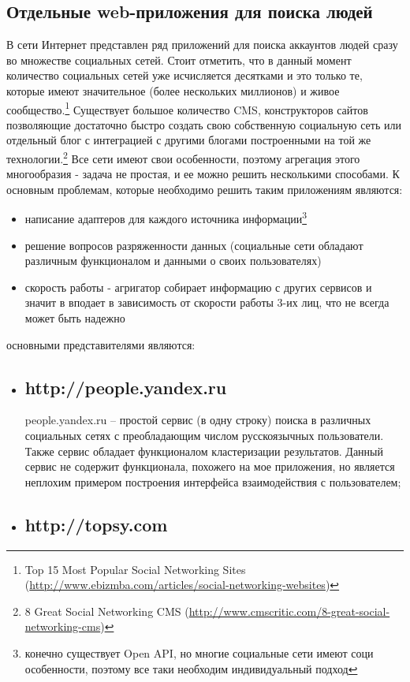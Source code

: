 \begin{chap1}
\subsection{Отдельные web-приложения для поиска людей}
В сети Интернет представлен ряд приложений для поиска аккаунтов людей сразу во множестве социальных сетей. Стоит отметить, что в данный момент количество социальных сетей уже исчисляется десятками и это только те, которые имеют значительное (более нескольких миллионов) и живое сообщество.\footnote{Top 15 Most Popular Social Networking Sites (\url{http://www.ebizmba.com/articles/social-networking-websites})}
 Существует большое количество CMS,%
конструкторов сайтов позволяющие достаточно быстро создать свою собственную социальную сеть или отдельный блог с интеграцией с другими блогами построенными на той же технологии.\footnote{8 Great Social Networking CMS (\url{http://www.cmscritic.com/8-great-social-networking-cms})} 
Все сети имеют свои особенности,  поэтому агрегация этого многообразия - задача не простая, и ее можно решить несколькими способами. К основным проблемам, которые необходимо решить таким приложениям являются:
\begin{itemize}
\item написание адаптеров для каждого источника информации\footnote{конечно существует Open API, но многие социальные сети имеют соци особенности, поэтому все таки необходим индивидуальный подход}
\item решение вопросов разряженности данных (социальные сети обладают различным функционалом и данными о своих пользователях)
\item скорость работы - агригатор собирает информацию с других сервисов и значит в вподает в зависимость от скорости работы 3-их лиц, что не всегда может быть надежно
\end{itemize}
основными представителями являются:
\begin{itemize}
\item \subsection{http://people.yandex.ru} %
people.yandex.ru – простой сервис (в одну строку) поиска в различных социальных сетях с преобладающим числом  русскоязычных пользователи. Также сервис обладает функционалом кластеризации результатов.  Данный сервис не содержит функционала,  похожего на мое приложения, но является неплохим примером построения интерфейса взаимодействия с пользователем;
\item \subsection{http://topsy.com}

\end{itemize}
\end{chap1}
